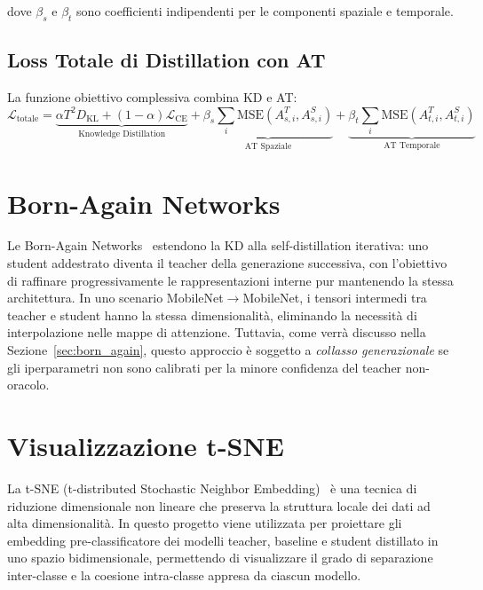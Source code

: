 dove $\beta_s$ e $\beta_t$ sono coefficienti indipendenti per le componenti spaziale e temporale.

\subsection{Loss Totale di Distillation con AT}

La funzione obiettivo complessiva combina KD e AT:
\begin{equation}
    \mathcal{L}_{\text{totale}} = \underbrace{\alpha T^2 D_{\text{KL}} + (1-\alpha)\mathcal{L}_{\text{CE}}}_{\text{Knowledge Distillation}} + \underbrace{\beta_s \sum_i \text{MSE}(A^T_{s,i}, A^S_{s,i})}_{\text{AT Spaziale}} + \underbrace{\beta_t \sum_i \text{MSE}(A^T_{t,i}, A^S_{t,i})}_{\text{AT Temporale}}
    \label{eq:total_loss}
\end{equation}

\section{Born-Again Networks}

Le Born-Again Networks~\cite{furlanello2018born} estendono la KD alla self-distillation iterativa: uno student addestrato diventa il teacher della generazione successiva, con l'obiettivo di raffinare progressivamente le rappresentazioni interne pur mantenendo la stessa architettura. In uno scenario MobileNet$\rightarrow$MobileNet, i tensori intermedi tra teacher e student hanno la stessa dimensionalità, eliminando la necessità di interpolazione nelle mappe di attenzione. Tuttavia, come verrà discusso nella Sezione~\ref{sec:born_again}, questo approccio è soggetto a \textit{collasso generazionale} se gli iperparametri non sono calibrati per la minore confidenza del teacher non-oracolo.

\section{Visualizzazione t-SNE}

La t-SNE (t-distributed Stochastic Neighbor Embedding)~\cite{vandermaaten2008tsne} è una tecnica di riduzione dimensionale non lineare che preserva la struttura locale dei dati ad alta dimensionalità. In questo progetto viene utilizzata per proiettare gli embedding pre-classificatore dei modelli teacher, baseline e student distillato in uno spazio bidimensionale, permettendo di visualizzare il grado di separazione inter-classe e la coesione intra-classe appresa da ciascun modello.
